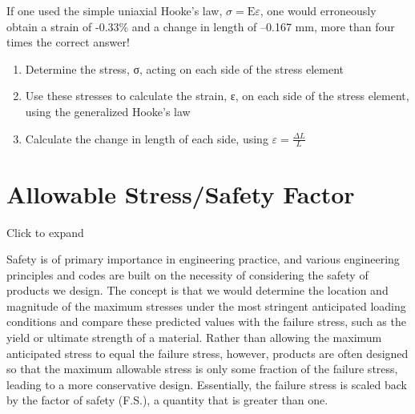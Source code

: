 \documentclass[
  letterpaper,
  DIV=11,
  numbers=noendperiod]{scrreprt}
\providecommand{\tightlist}{%
  \setlength{\itemsep}{0pt}\setlength{\parskip}{0pt}}\usepackage{longtable,booktabs,array}
\begin{document}
\begin{tcolorbox}
\begin{tcolorbox}
If one used the simple uniaxial Hooke's law,
\(\sigma=\mathrm{E} \varepsilon\), one would erroneously obtain a strain
of -0.33\% and a change in length of --0.167 mm, more than four times
the correct answer!

\end{tcolorbox}

\end{tcolorbox}

\begin{tcolorbox}[enhanced jigsaw, breakable, opacityback=0, toptitle=1mm, left=2mm, colback=white, opacitybacktitle=0.6, colframe=quarto-callout-warning-color-frame, titlerule=0mm, arc=.35mm, leftrule=.75mm, bottomtitle=1mm, colbacktitle=quarto-callout-warning-color!10!white, rightrule=.15mm, title={Step-by-step: Multiaxial Hooke's Law}, bottomrule=.15mm, toprule=.15mm, coltitle=black]

\begin{enumerate}
\def\labelenumi{\arabic{enumi}.}
\tightlist
\item
  Determine the stress, σ, acting on each side of the stress element
\item
  Use these stresses to calculate the strain, ε, on each side of the
  stress element, using the generalized Hooke's law
\item
  Calculate the change in length of each side, using
  \(\varepsilon=\frac{\Delta L}{L}\)
\end{enumerate}

\end{tcolorbox}

\section{Allowable Stress/Safety Factor}\label{sec-4.8}

Click to expand

Safety is of primary importance in engineering practice, and various
engineering principles and codes are built on the necessity of
considering the safety of products we design. The concept is that we
would determine the location and magnitude of the maximum stresses under
the most stringent anticipated loading conditions and compare these
predicted values with the failure stress, such as the yield or ultimate
strength of a material. Rather than allowing the maximum anticipated
stress to equal the failure stress, however, products are often designed
so that the maximum allowable stress is only some fraction of the
failure stress, leading to a more conservative design. Essentially, the
failure stress is scaled back by the factor of safety (F.S.), a quantity
that is greater than one.
\end{document}
